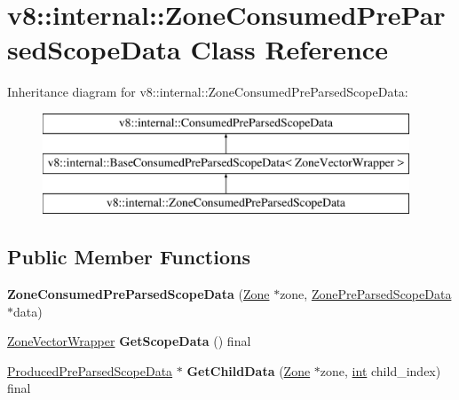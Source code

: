 \hypertarget{classv8_1_1internal_1_1ZoneConsumedPreParsedScopeData}{}\section{v8\+:\+:internal\+:\+:Zone\+Consumed\+Pre\+Parsed\+Scope\+Data Class Reference}
\label{classv8_1_1internal_1_1ZoneConsumedPreParsedScopeData}
Inheritance diagram for v8\+:\+:internal\+:\+:Zone\+Consumed\+Pre\+Parsed\+Scope\+Data\+:\begin{figure}[H]
\begin{center}
\leavevmode
\includegraphics[height=3.000000cm]{classv8_1_1internal_1_1ZoneConsumedPreParsedScopeData}
\end{center}
\end{figure}
\subsection*{Public Member Functions}
\begin{DoxyCompactItemize}
\item 
\mbox{\label{classv8_1_1internal_1_1ZoneConsumedPreParsedScopeData_ae6e45f0d64e761716cf3f8b4d7e904c7}} 
{\bfseries Zone\+Consumed\+Pre\+Parsed\+Scope\+Data} (\mbox{\hyperlink{classv8_1_1internal_1_1Zone}{Zone}} $\ast$zone, \mbox{\hyperlink{classv8_1_1internal_1_1ZonePreParsedScopeData}{Zone\+Pre\+Parsed\+Scope\+Data}} $\ast$data)
\item 
\mbox{\label{classv8_1_1internal_1_1ZoneConsumedPreParsedScopeData_aea622a6600935025066e25c6104e19d6}} 
\mbox{\hyperlink{classv8_1_1internal_1_1ZoneVectorWrapper}{Zone\+Vector\+Wrapper}} {\bfseries Get\+Scope\+Data} () final
\item 
\mbox{\label{classv8_1_1internal_1_1ZoneConsumedPreParsedScopeData_ab8501e006e66b24e11e48d83c9e30728}} 
\mbox{\hyperlink{classv8_1_1internal_1_1ProducedPreParsedScopeData}{Produced\+Pre\+Parsed\+Scope\+Data}} $\ast$ {\bfseries Get\+Child\+Data} (\mbox{\hyperlink{classv8_1_1internal_1_1Zone}{Zone}} $\ast$zone, \mbox{\hyperlink{classint}{int}} child\+\_\+index) final
\end{DoxyCompactItemize}
